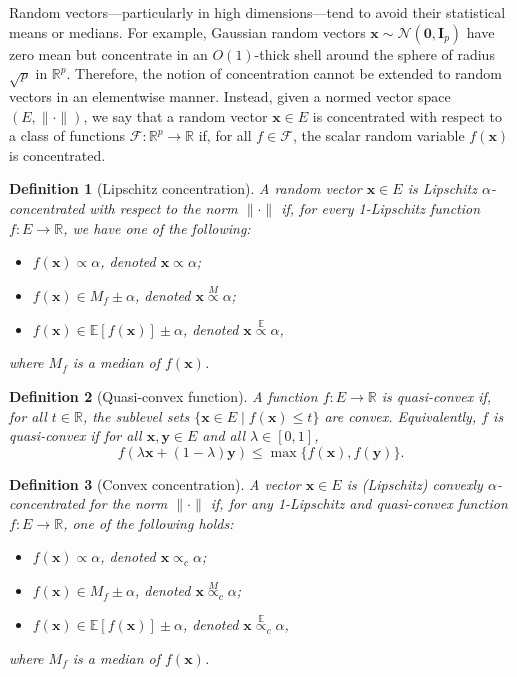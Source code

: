 \documentclass[12pt]{article}
\newtheorem{definition}{Definition}
\begin{document}
Random vectors—particularly in high dimensions—tend to avoid their statistical means or medians. For example, Gaussian random vectors $ \mathbf{x} \sim \mathcal{N}(\mathbf{0}, \mathbf{I}_p) $ have zero mean but concentrate in an $ O(1) $-thick shell around the sphere of radius $ \sqrt{p} $ in $ \mathbb{R}^p $. Therefore, the notion of concentration cannot be extended to random vectors in an elementwise manner. Instead, given a normed vector space $ (E, \| \cdot \|) $, we say that a random vector $ \mathbf{x} \in E $ is concentrated with respect to a class of functions $ \mathcal{F} : \mathbb{R}^p \to \mathbb{R} $ if, for all $ f \in \mathcal{F} $, the scalar random variable $ f(\mathbf{x}) $ is concentrated.

\begin{definition}[Lipschitz concentration]
A random vector $\mathbf{x} \in E$ is Lipschitz $\alpha$-concentrated with respect to the norm $\| \cdot \|$ if, for every 1-Lipschitz function $f: E \rightarrow \mathbb{R}$, we have one of the following:
\begin{itemize}
    \item $f(\mathbf{x}) \propto \alpha$, denoted $\mathbf{x} \propto \alpha$;
    \item $f(\mathbf{x}) \in M_f \pm \alpha$, denoted $\mathbf{x} \mathrel{\overset{M}{\propto}} \alpha$;
    \item $f(\mathbf{x}) \in \mathbb{E}[f(\mathbf{x})] \pm \alpha$, denoted $\mathbf{x} \mathrel{\overset{\mathbb{E}}{\propto}} \alpha$,
\end{itemize}
where $M_f$ is a median of $f(\mathbf{x})$.
\end{definition}

\begin{definition}[Quasi-convex function]
A function $f: E \rightarrow \mathbb{R}$ is quasi-convex if, for all $t \in \mathbb{R}$, the sublevel sets $\{\mathbf{x} \in E \mid f(\mathbf{x}) \leq t\}$ are convex. Equivalently, $f$ is quasi-convex if for all $\mathbf{x}, \mathbf{y} \in E$ and all $\lambda \in [0,1]$,
$$
f(\lambda \mathbf{x} + (1 - \lambda) \mathbf{y}) \leq \max\{f(\mathbf{x}), f(\mathbf{y})\}.
$$
\end{definition} 

\begin{definition}[Convex concentration]
A vector $\mathbf{x} \in E$ is (Lipschitz) convexly $\alpha$-concentrated for the norm $\| \cdot \|$ if, for any 1-Lipschitz and quasi-convex function $f: E \rightarrow \mathbb{R}$, one of the following holds:
\begin{itemize}
    \item $f(\mathbf{x}) \propto \alpha$, denoted $\mathbf{x} \propto_{c} \alpha$;
    \item $f(\mathbf{x}) \in M_f \pm \alpha$, denoted $\mathbf{x} \mathrel{\overset{M}{\propto}}_{c} \alpha$;
    \item $f(\mathbf{x}) \in \mathbb{E}[f(\mathbf{x})] \pm \alpha$, denoted $\mathbf{x} \mathrel{\overset{\mathbb{E}}{\propto}}_{c} \alpha$,
\end{itemize}
where $M_f$ is a median of $f(\mathbf{x})$.
\end{definition}
\end{document}
